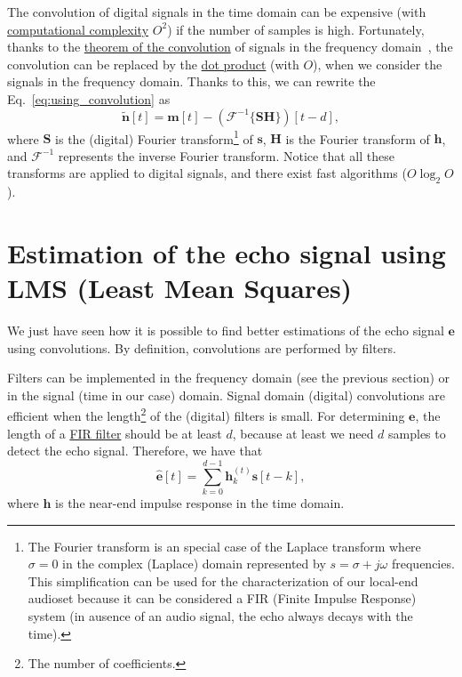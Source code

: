 The convolution of digital signals in the time domain can be expensive
(with
\href{https://en.wikipedia.org/wiki/Computational_complexity_theory}{computational
  complexity} $O^2$) if the number of samples is high. Fortunately,
thanks to the \href{https://en.wikipedia.org/wiki/Convolution}{theorem
  of the convolution} of signals in the frequency
domain~\cite{kovacevic2013fourier,Oppenheim2}, the convolution can be
replaced by the \href{https://en.wikipedia.org/wiki/Dot_product}{dot
  product} (with $O$), when we consider the signals in the frequency
domain. Thanks to this, we can rewrite the Eq.~\eqref{eq:using_convolution} as
\begin{equation}
  \tilde{\mathbf n}[t] = {\mathbf m}[t] - ({\mathcal F}^{-1}\{{\mathbf S}{\mathbf H}\})[t-d],
  \label{eq:faster}
\end{equation}
where ${\mathbf S}$ is the (digital) Fourier transform\footnote{The
  Fourier transform is an special case of the Laplace transform where
  $\sigma=0$ in the complex (Laplace) domain represented by
  $s=\sigma+j\omega$ frequencies. This simplification can be used for
  the characterization of our local-end audioset because it can be
  considered a FIR (Finite Impulse Response) system (in ausence of an
  audio signal, the echo always decays with the time).} of
${\mathbf s}$, ${\mathbf H}$ is the Fourier transform of
${\mathbf h}$, and ${\mathcal F}^{-1}$ represents the inverse Fourier
transform. Notice that all these transforms are applied to digital
signals, and there exist fast algorithms ($O\log_2O$).

\section{Estimation of the echo signal using LMS (Least Mean Squares)}
We just have seen how it is possible to find better estimations of the
echo signal ${\mathbf e}$ using convolutions. By definition,
convolutions are performed by filters.

Filters can be implemented in the frequency domain (see the previous
section) or in the signal (time in our case) domain. Signal domain
(digital) convolutions are efficient when the length\footnote{The
  number of coefficients.} of the (digital) filters is small. For
determining ${\mathbf e}$, the length of a
\href{https://en.wikipedia.org/wiki/Finite_impulse_response}{FIR
  filter} should be at least $d$, because at least we need $d$ samples
to detect the echo signal. Therefore, we have that
\begin{equation}
  \hat{\mathbf e}[t] = \sum_{k=0}^{d-1}{\mathbf h}_k^{(t)}{\mathbf s}[t-k],
\end{equation}
where ${\mathbf h}$ is the near-end impulse response in the time
domain.

